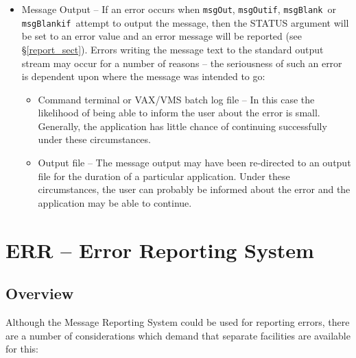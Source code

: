 \documentclass[twoside,11pt]{article}
\newcommand{\htmlref}[2]{#1}
\newcommand{\latex}[1]{#1}
\newcommand{\xlabel}[1]{}
\renewcommand{\_}{\texttt{\symbol{95}}}
\newcommand{\func}[1]{\texttt{#1}}
\newcommand{\msgblank}{\func{msgBlank}}
\newcommand{\msgblankif}{\func{msgBlankif}}
\newcommand{\msgout}{\func{msgOut}}
\newcommand{\msgoutif}{\func{msgOutif}}
\begin{document}
\begin {itemize}
\item Message Output -- If an error occurs when
\msgout, \msgoutif, \msgblank\ or \msgblankif\ attempt to output the message, then the 
STATUS argument will be set to an error value and an  error message will be 
\htmlref{reported}{report_sect}\latex{ (see \S\ref{report_sect})}.
Errors writing the message text to the standard output stream may occur for a
number of reasons -- the seriousness of such an error is dependent upon where 
the message was intended to go:

\begin {itemize}
\item Command terminal or VAX/VMS batch log file -- 
In this case the likelihood of being able to inform the user about the error
is small.
Generally, the application has little chance of continuing successfully under
these circumstances.

\item Output file -- 
The message output may have been re-directed to an output file for the
duration of a particular application. 
Under these circumstances, the user can probably be informed about the error
and the application may be able to continue.
\end {itemize}
\end {itemize}


\section{\xlabel{err_error_reporting_system}ERR -- Error Reporting System \xlabel{err}}

\subsection{\xlabel{overview}Overview}

Although the Message Reporting System could be used for reporting errors, there
are a number of considerations which demand that separate facilities are
available for this:
\end{document}
